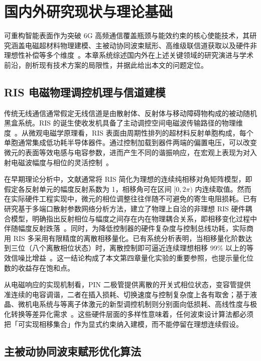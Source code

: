 \chapter{国内外研究现状与理论基础}
\label{chap:related_work}

可重构智能表面作为突破 6G 高频通信覆盖瓶颈与能效约束的核心使能技术，其研究涵盖电磁超材料物理建模、主被动协同波束赋形、高维级联信道获取以及硬件非理想性补偿等多个维度~\cite{wang2023road,liu2022integrated}。本章系统综述国内外在上述关键领域的研究演进与学术前沿，剖析现有技术方案的局限性，并据此给出本文的问题定位。

\section{RIS 电磁物理调控机理与信道建模}

传统无线通信通常假定无线信道是由散射体、反射体与移动障碍物构成的被动随机黑盒系统。RIS 的诞生使收发机具备了主动调控空间电磁波传输路径的物理维度~\cite{wu2020towards}。从微观电磁学原理看，RIS 表面由周期性排列的超材料反射单胞构成，每个单胞通常集成低功耗半导体器件。通过控制加载到器件两端的偏置电压，可以改变微元的表面等效电感与电容参数，进而产生不同的谐振响应，在宏观上表现为对入射电磁波幅度与相位的灵活控制~\cite{rana2023ris}。

在早期理论分析中，文献通常将 RIS 简化为理想的连续纯相移对角矩阵模型，即假定各反射单元的幅度反射系数为 1，相移角可在区间 $[0,2\pi)$ 内连续取值。然而在实际硬件工程实现中，微元的相位调整往往伴随不可避免的寄生电阻损耗。已有研究基于多端口散射参数网络分析方法，建立了物理上自洽的非理想 RIS 硬件耦合模型，明确指出反射相位与幅度之间存在内在物理耦合关系，即相移变化过程中伴随幅度反射跌落~\cite{shen2022modeling}。同时，为降低控制器的硬件复杂度与控制总线功耗，实际商用 RIS 多采用有限精度的离散相移量化。已有系统分析表明，当相移量化阶数达到三位（八个离散相位状态）时，离散控制即可逼近连续理想相移 99\% 以上的等效信噪比增益~\cite{wu2020towards}。这一结论构成了本文第四章量化实验的重要参照，也提示量化位数的收益存在饱和点。

从电磁响应的实现机制看，PIN 二极管提供离散的开关式相位状态，变容管提供准连续的电容调谐，二者在插入损耗、切换速度与控制复杂度上各有取舍；基于液晶、微机电系统与等离子体激元的新型调控机制则分别面向低损耗、高线性度与极化转换等差异化需求~\cite{magarotto2023ris}。这些硬件层面的多样性意味着，任何波束设计算法都必须把「可实现相移集合」作为显式约束纳入建模，而不能停留在理想连续假设。

\section{主被动协同波束赋形优化算法}

